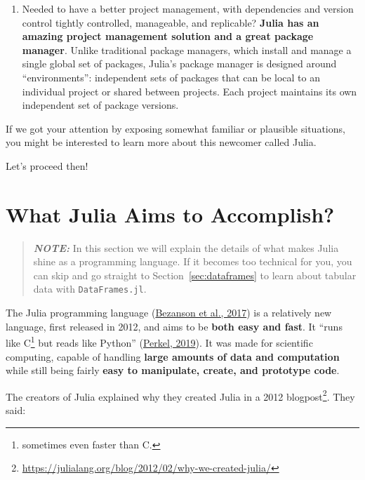 \documentclass[
  notoc %
]{tufte-book}
\DeclareRobustCommand{\href}[2]{#2\footnote{\url{#1}}}
\newcommand{\passthrough}[1]{#1}
\begin{document}
\begin{enumerate}
  packages are being used by other libraries in ways that they could not
  have imagined. We have some examples in
  Section~\ref{sec:multiple_dispatch}.
\item
  Needed to have a better project management, with dependencies and
  version control tightly controlled, manageable, and replicable?
  \textbf{Julia has an amazing project management solution and a great
  package manager}. Unlike traditional package managers, which install
  and manage a single global set of packages, Julia's package manager is
  designed around ``environments'': independent sets of packages that
  can be local to an individual project or shared between projects. Each
  project maintains its own independent set of package versions.
\end{enumerate}

If we got your attention by exposing somewhat familiar or plausible
situations, you might be interested to learn more about this newcomer
called Julia.

Let's proceed then!

\hypertarget{sec:julia_accomplish}{%
\section{What Julia Aims to Accomplish?}\label{sec:julia_accomplish}}

\begin{quote}
\textbf{\emph{NOTE:}} In this section we will explain the details of
what makes Julia shine as a programming language. If it becomes too
technical for you, you can skip and go straight to
Section~\ref{sec:dataframes} to learn about tabular data with
\passthrough{\lstinline!DataFrames.jl!}.
\end{quote}

The Julia programming language
(\protect\hyperlink{ref-bezanson2017julia}{Bezanson et al., 2017}) is a
relatively new language, first released in 2012, and aims to be
\textbf{both easy and fast}. It ``runs like C\footnote{sometimes even
  faster than C.} but reads like Python''
(\protect\hyperlink{ref-perkelJuliaComeSyntax2019}{Perkel, 2019}). It
was made for scientific computing, capable of handling \textbf{large
amounts of data and computation} while still being fairly \textbf{easy
to manipulate, create, and prototype code}.

The creators of Julia explained why they created Julia in a
\href{https://julialang.org/blog/2012/02/why-we-created-julia/}{2012
blogpost}. They said:
\end{document}
